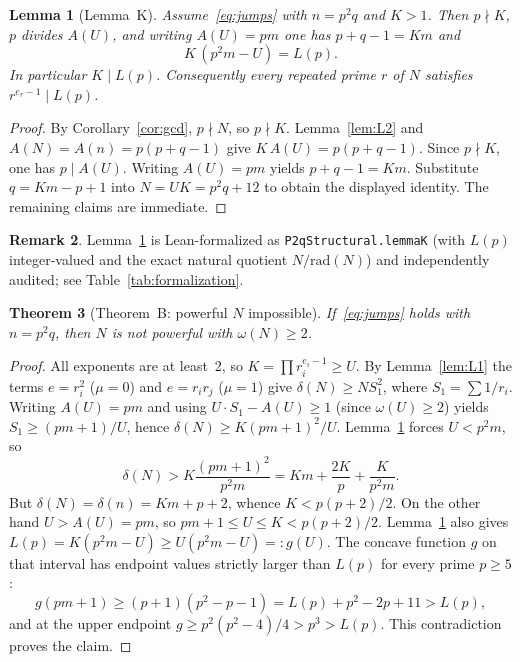 \documentclass[11pt,reqno]{amsart}
\newtheorem{theorem}{Theorem}
\newtheorem{lemma}[theorem]{Lemma}
\theoremstyle{definition}
\newtheorem{remark}[theorem]{Remark}
\begin{document}
\begin{lemma}[Lemma~K]
\label{lem:K}
Assume~\eqref{eq:jumps} with \(n=p^2q\) and \(K>1\). Then \(p\nmid K\), \(p\) divides \(A(U)\), and writing \(A(U)=pm\) one has \(p+q-1=Km\) and
\[
K\,(p^2m-U)=L(p).
\]
In particular \(K\mid L(p)\). Consequently every repeated prime \(r\) of \(N\) satisfies \(r^{e_r-1}\mid L(p)\).
\end{lemma}

\begin{proof}
By Corollary~\ref{cor:gcd}, \(p\nmid N\), so \(p\nmid K\). Lemma~\ref{lem:L2} and \(A(N)=A(n)=p(p+q-1)\) give \(K\,A(U)=p(p+q-1)\). Since \(p\nmid K\), one has \(p\mid A(U)\). Writing \(A(U)=pm\) yields \(p+q-1=Km\). Substitute \(q=Km-p+1\) into \(N=UK=p^2q+12\) to obtain the displayed identity. The remaining claims are immediate.
\end{proof}

\begin{remark}
Lemma~\ref{lem:K} is Lean-formalized as \texttt{P2qStructural.lemmaK} (with \(L(p)\) integer-valued and the exact natural quotient \(N/\mathrm{rad}(N)\)) and independently audited; see Table~\ref{tab:formalization}.
\end{remark}

\begin{theorem}[Theorem~B: powerful \(N\) impossible]
\label{thm:B}
If~\eqref{eq:jumps} holds with \(n=p^2q\), then \(N\) is not powerful with \(\omega(N)\ge 2\).
\end{theorem}

\begin{proof}
All exponents are at least~2, so \(K=\prod r_i^{e_i-1}\ge U\). By Lemma~\ref{lem:L1} the terms \(e=r_i^2\) (\(\mu=0\)) and \(e=r_ir_j\) (\(\mu=1\)) give \(\delta(N)\ge N S_1^2\), where \(S_1=\sum 1/r_i\). Writing \(A(U)=pm\) and using \(U\cdot S_1-A(U)\ge 1\) (since \(\omega(U)\ge 2\)) yields \(S_1\ge(pm+1)/U\), hence \(\delta(N)\ge K(pm+1)^2/U\). Lemma~\ref{lem:K} forces \(U<p^2m\), so
\[
\delta(N)>K\frac{(pm+1)^2}{p^2m}=Km+\frac{2K}{p}+\frac{K}{p^2m}.
\]
But \(\delta(N)=\delta(n)=Km+p+2\), whence \(K<p(p+2)/2\). On the other hand \(U>A(U)=pm\), so \(pm+1\le U\le K<p(p+2)/2\). Lemma~\ref{lem:K} also gives \(L(p)=K(p^2m-U)\ge U(p^2m-U)=:g(U)\). The concave function \(g\) on that interval has endpoint values strictly larger than \(L(p)\) for every prime \(p\ge 5\):
\[
g(pm+1)\ge(p+1)(p^2-p-1)=L(p)+p^2-2p+11>L(p),
\]
and at the upper endpoint \(g\ge p^2(p^2-4)/4>p^3>L(p)\). This contradiction proves the claim.
\end{proof}
\end{document}
